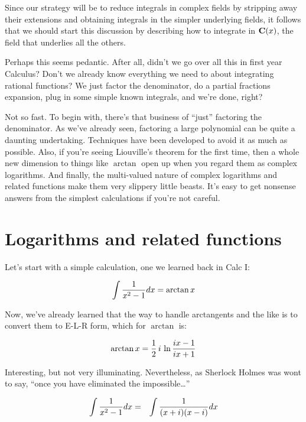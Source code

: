 

Since our strategy will be to reduce integrals in complex fields by
stripping away their extensions and obtaining integrals in the simpler
underlying fields, it follows that we should start this discussion by
describing how to integrate in ${\bf C}(x)$, the field that underlies
all the others.

Perhaps this seems pedantic.  After all, didn't we go over all this in
first year Calculus?  Don't we already know everything we need to
about integrating rational functions?  We just factor the denominator,
do a partial fractions expansion, plug in some simple known integrals,
and we're done, right?

Not so fast.  To begin with, there's that business of ``just''
factoring the denominator.  As we've already seen, factoring a large
polynomial can be quite a daunting undertaking.  Techniques have been
developed to avoid it as much as possible.  Also, if you're seeing
Liouville's theorem for the first time, then a whole new dimension to
things like $\arctan$ open up when you regard them as complex
logarithms.  And finally, the multi-valued nature of complex
logarithms and related functions make them very slippery little
beasts.  It's easy to get nonsense answers from the simplest
calculations if you're not careful.

\section{Logarithms and related functions}

Let's start with a simple calculation, one we learned back in Calc I:

$$\int{1\over{x^2-1}}dx = \arctan x$$

Now, we've already learned that the way to handle arctangents and the
like is to convert them to E-L-R form, which for $\arctan$ is:

$$\arctan x = {1\over2}\,i\,\ln {{ix-1}\over{ix+1}}$$

Interesting, but not very illuminating.  Nevertheless, as Sherlock
Holmes was wont to say, ``once you have eliminated the impossible\ldots''


\begin{eqnarray*}
\int{1\over{x^2-1}} dx &=& \int{1\over{(x+i)(x-i)}} dx \\
\end{eqnarray*}

